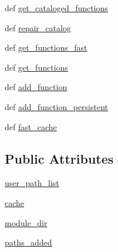 \begin{DoxyCompactItemize}
\item 
def \hyperlink{classscipy_1_1weave_1_1catalog_1_1catalog_a8547ba847c74fc7059d15a50a3b0eeb8}{get\+\_\+cataloged\+\_\+functions}
\item 
def \hyperlink{classscipy_1_1weave_1_1catalog_1_1catalog_aba25b7d8e0a9106c49257e4975ee8b2b}{repair\+\_\+catalog}
\item 
def \hyperlink{classscipy_1_1weave_1_1catalog_1_1catalog_a2a4bd67fb11c178d9210ac99a52f5089}{get\+\_\+functions\+\_\+fast}
\item 
def \hyperlink{classscipy_1_1weave_1_1catalog_1_1catalog_a162cf734d0970e68aa728f589f914c07}{get\+\_\+functions}
\item 
def \hyperlink{classscipy_1_1weave_1_1catalog_1_1catalog_a64c2beb4f9cb3b16b71d89d1f10c865a}{add\+\_\+function}
\item 
def \hyperlink{classscipy_1_1weave_1_1catalog_1_1catalog_acdbb83b794c4bd2be516fd26bb81d67c}{add\+\_\+function\+\_\+persistent}
\item 
def \hyperlink{classscipy_1_1weave_1_1catalog_1_1catalog_a111a224265a05f7244d6d731293bcf01}{fast\+\_\+cache}
\end{DoxyCompactItemize}
\subsection*{Public Attributes}
\begin{DoxyCompactItemize}
\item 
\hyperlink{classscipy_1_1weave_1_1catalog_1_1catalog_a7e9ccbad5ee7f3c748f5c947dbea5609}{user\+\_\+path\+\_\+list}
\item 
\hyperlink{classscipy_1_1weave_1_1catalog_1_1catalog_ab6f5ba4976797745e4153d8a516524ee}{cache}
\item 
\hyperlink{classscipy_1_1weave_1_1catalog_1_1catalog_abc0bb846e68d9afb765eeb178a2ddfd2}{module\+\_\+dir}
\item 
\hyperlink{classscipy_1_1weave_1_1catalog_1_1catalog_ab15f313507364c4523f25895e53f52e6}{paths\+\_\+added}
\end{DoxyCompactItemize}


